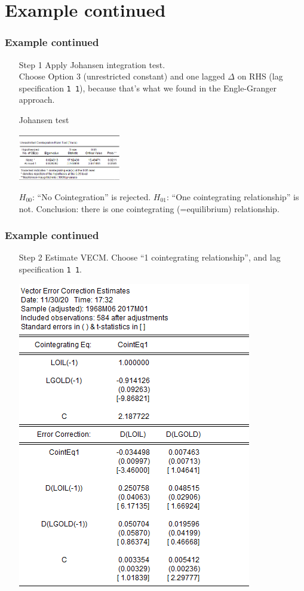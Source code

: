 \section*{Example continued}
\begin{frame}[shrink]\frametitle{Example continued}
\begin{itemize}
\item[Step 1] Apply Johansen integration test.\\ Choose Option 3 (unrestricted constant) and one lagged $\Delta$ on RHS (lag specification \texttt{1 1}), because that's what we found in the Engle-Granger approach.
\begin{block}{Johansen test}
\begin{center}
\includegraphics[width=0.35\textwidth]{johansen.png}
\end{center}
\end{block}
$H_{00}$: ``No Cointegration'' is rejected. $H_{01}$: ``One cointegrating relationship'' is not. Conclusion: there is one cointegrating (=equilibrium) relationship.
\end{itemize}
\end{frame}

\begin{frame}[shrink]\frametitle{Example continued}
\begin{itemize}
\item[Step 2] Estimate VECM. Choose ``1 cointegrating relationship'', and lag specification \texttt{1 1}.
\begin{center}
\includegraphics[height=0.6\textheight]{vecm3.png}
\end{center}
\end{itemize}
\end{frame}

